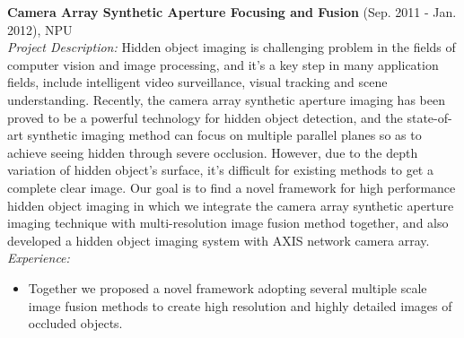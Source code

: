 \documentclass[margin]{res}
\begin{document}
\begin{resume}
                {\bf Camera Array Synthetic Aperture Focusing and Fusion} \hfill (Sep. 2011 - Jan. 2012), NPU\\
                {\sl Project Description: } Hidden object imaging is challenging problem in the fields
                of computer vision and image processing, and it’s a key step in many
                application fields, include intelligent video surveillance, visual tracking
                and scene understanding. Recently, the camera array synthetic aperture
                imaging has been proved to be a powerful technology for hidden object
                detection, and the state-of-art synthetic imaging method can focus on
                multiple parallel planes so as to achieve seeing hidden through severe
                occlusion. However, due to the depth variation of hidden object’s surface,
                it’s difficult for existing methods to get a complete clear image. Our goal is to find a novel framework for high performance hidden object
                imaging in which we integrate the camera array synthetic aperture
                imaging technique with multi-resolution image fusion method together, and also
                developed a hidden object imaging system with AXIS network camera array. \\
                {\sl Experience: }
                \begin{itemize} \itemsep -2pt %
                \item Together we proposed a novel framework adopting several multiple scale image fusion methods to create high resolution and highly detailed images of occluded objects.
                \end{itemize}


\end{resume}
\end{document}
